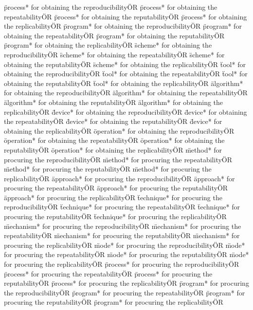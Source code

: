 \documentclass[
10pt, %
a4paper, %
oneside, %
headinclude,footinclude, %
BCOR5mm, %
]{scrartcl}
\begin{document}
\"process* for obtaining the reproducibility\" OR \"process* for obtaining the repeatability\" OR \"process* for obtaining the reputability\" OR \"process* for obtaining the replicability\" OR 
\"program* for obtaining the reproducibility\" OR \"program* for obtaining the repeatability\" OR \"program* for obtaining the reputability\" OR \"program* for obtaining the replicability\" OR 
\"scheme* for obtaining the reproducibility\" OR \"scheme* for obtaining the repeatability\" OR \"scheme* for obtaining the reputability\" OR \"scheme* for obtaining the replicability\" OR 
\"tool* for obtaining the reproducibility\" OR \"tool* for obtaining the repeatability\" OR \"tool* for obtaining the reputability\" OR \"tool* for obtaining the replicability\" OR 
\"algorithm* for obtaining the reproducibility\" OR \"algorithm* for obtaining the repeatability\" OR \"algorithm* for obtaining the reputability\" OR \"algorithm* for obtaining the replicability\" OR 
\"device* for obtaining the reproducibility\" OR \"device* for obtaining the repeatability\" OR \"device* for obtaining the reputability\" OR \"device* for obtaining the replicability\" OR 
\"operation* for obtaining the reproducibility\" OR \"operation* for obtaining the repeatability\" OR \"operation* for obtaining the reputability\" OR \"operation* for obtaining the replicability\" OR 
\"method* for procuring the reproducibility\" OR \"method* for procuring the repeatability\" OR \"method* for procuring the reputability\" OR \"method* for procuring the replicability\" OR 
\"approach* for procuring the reproducibility\" OR \"approach* for procuring the repeatability\" OR \"approach* for procuring the reputability\" OR \"approach* for procuring the replicability\" OR 
\"technique* for procuring the reproducibility\" OR \"technique* for procuring the repeatability\" OR \"technique* for procuring the reputability\" OR \"technique* for procuring the replicability\" OR 
\"mechanism* for procuring the reproducibility\" OR \"mechanism* for procuring the repeatability\" OR \"mechanism* for procuring the reputability\" OR \"mechanism* for procuring the replicability\" OR 
\"mode* for procuring the reproducibility\" OR \"mode* for procuring the repeatability\" OR \"mode* for procuring the reputability\" OR \"mode* for procuring the replicability\" OR 
\"process* for procuring the reproducibility\" OR \"process* for procuring the repeatability\" OR \"process* for procuring the reputability\" OR \"process* for procuring the replicability\" OR 
\"program* for procuring the reproducibility\" OR \"program* for procuring the repeatability\" OR \"program* for procuring the reputability\" OR \"program* for procuring the replicability\" OR 
\end{document}
